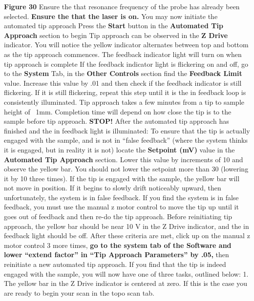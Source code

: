 \documentclass{../lab}
\begin{document}
\textbf{Figure 30}
Ensure the that resonance frequency of the probe has already been selected. \textbf{Ensure the that the laser is on.} You may now initiate the automated tip approach
Press the \textbf{ Start} button in the \textbf{Automated Tip Approach }section to begin
Tip approach can be observed in the \textbf{Z Drive} indicator. You will notice the yellow indicator alternates between top and bottom as the tip approach commences.
The feedback indicator light will turn on when tip approach is complete
If the feedback indicator light is flickering on and off, go to the \textbf{System }Tab, in the \textbf{Other Controls} section find the \textbf{Feedback Limit }value.  Increase this value by .01 and then check if the feedback indicator is still flickering.  If it is still flickering, repeat this step until it is the in feedback loop is consistently illuminated.
Tip approach takes a few minutes from a tip to sample height of ~1mm.  Completion time will depend on how close the tip is to the sample before tip approach.
\textbf{STOP!} After the automated tip approach has finished and the in feedback light is illuminated:
To ensure that the tip is actually engaged with the sample, and is not in ``false feedback'' (where the system thinks it is engaged, but in reality it is not) locate the \textbf{Setpoint (mV) }value in the \textbf{Automated Tip Approach} section. Lower this value by increments of 10 and observe the yellow bar. You should not lower the setpoint more than 30 (lowering it by 10 three times). If the tip is engaged with the sample, the yellow bar will not move in position. If it begins to slowly drift noticeably upward, then unfortunately, the system is in false feedback. If you find the system is in false feedback, you must use the manual z motor control to move the tip up until it goes out of feedback and then re-do the tip approach. Before reinitiating tip approach, the yellow bar should be near 10 V in the Z Drive indicator, and the in feedback light should be off. After these criteria are met, click up on the manual z motor control 3 more times, \textbf{go to the system tab of the Software and lower ``extend factor'' in ``Tip Approach Parameters'' by .05,} then reinitiate a new automated tip approach. If you find that the tip is indeed engaged with the sample, you will now have one of three tasks, outlined below:
1. The yellow bar in the Z Drive indicator is centered at zero. If this is the case you are ready to begin your scan in the topo scan tab.
\end{document}
